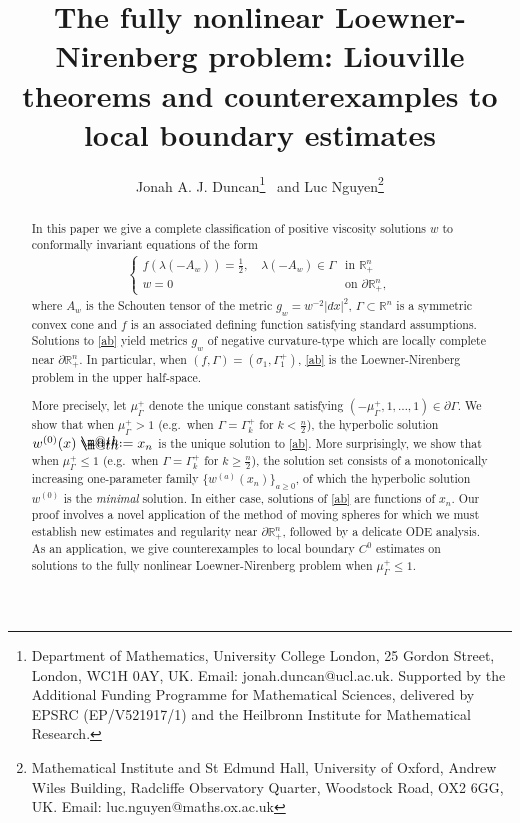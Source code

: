 \documentclass[12pt]{article}
\date{}
\makeatletter
\numberwithin{equation}{section}
\theoremstyle{plain}
\theoremstyle{definition}
\newcommand*{\defeq}{\mathrel{\rlap{%
			\raisebox{0.3ex}{$\m@th\cdot$}}%
		\raisebox{-0.3ex}{$\m@th\cdot$}}%
	=}
\makeatother
\begin{document}
	
	
	\title{The fully nonlinear Loewner-Nirenberg problem: Liouville theorems and counterexamples to local boundary estimates}
	\author{Jonah A. J. Duncan\footnote{Department of Mathematics, University College London, 25 Gordon Street, London, WC1H 0AY, UK. Email: jonah.duncan@ucl.ac.uk. Supported by the Additional Funding Programme for Mathematical Sciences, delivered by EPSRC (EP/V521917/1) and the Heilbronn Institute for Mathematical Research.} ~and Luc Nguyen\footnote{Mathematical Institute and St Edmund Hall, University of Oxford, Andrew Wiles Building, Radcliffe Observatory Quarter, Woodstock Road, OX2 6GG, UK. Email: luc.nguyen@maths.ox.ac.uk}}
	\maketitle

	\begin{abstract}
		In this paper we give a complete classification of positive viscosity solutions $w$ to conformally invariant equations of the form
		\begin{align}\label{ab}\tag{$*$}
		\begin{cases}
		f(\lambda(-A_w)) = \frac{1}{2}, \quad \lambda(-A_w)\in\Gamma & \text{in }\mathbb{R}_+^n \\
		w = 0 & \text{on }\partial\mathbb{R}_+^n,
		\end{cases}
		\end{align}
		where $A_w$ is the Schouten tensor of the metric $g_w = w^{-2}|dx|^2$, $\Gamma\subset\mathbb{R}^n$ is a symmetric convex cone and $f$ is an associated defining function satisfying standard assumptions. Solutions to \eqref{ab} yield metrics $g_w$ of negative curvature-type which are locally complete near $\partial\mathbb{R}_+^n$. In particular, when $(f,\Gamma) = (\sigma_1,\Gamma_1^+)$, \eqref{ab} is the Loewner-Nirenberg problem in the upper half-space. \medskip 
		
		More precisely, let $\mu_\Gamma^+$ denote the unique constant satisfying $(-\mu_\Gamma^+, 1,\dots,1)\in\partial\Gamma$. We show that when $\mu_\Gamma^+ >1$ (e.g.~when $\Gamma = \Gamma_k^+$ for $k<\frac{n}{2}$),  the hyperbolic solution $w^{(0)}(x) \defeq x_n$ is the unique solution to \eqref{ab}. More surprisingly, we show that when $\mu_\Gamma^+ \leq 1$ (e.g.~when $\Gamma = \Gamma_k^+$ for $k\geq \frac{n}{2}$), the solution set consists of a monotonically increasing one-parameter family $\{w^{(a)}(x_n)\}_{a\geq 0}$, of which the hyperbolic solution $w^{(0)}$ is the \textit{minimal} solution. In either case, solutions of \eqref{ab} are functions of $x_n$. Our proof involves a novel application of the method of moving spheres for which we must establish new estimates and regularity near $\partial\mathbb{R}_+^n$, followed by a delicate ODE analysis. As an application, we give counterexamples to local boundary $C^0$ estimates on solutions to the fully nonlinear Loewner-Nirenberg problem when $\mu_\Gamma^+ \leq 1$.\bigskip 
		~
	\end{abstract}
	
\end{document}
